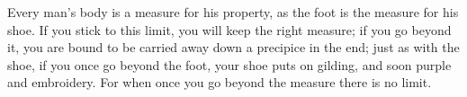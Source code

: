 Every man's body is a measure for his  property, as the foot is the measure for
his shoe. If you  stick to this limit, you will keep the  right measure; if you
go beyond  it, you are bound  to be carried away  down a precipice in  the end;
just as  with the  shoe, if  you once  go beyond  the foot,  your shoe  puts on
gilding,  and soon  purple and  embroidery.  For when  once you  go beyond  the
measure there is no limit.
